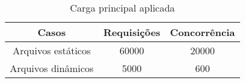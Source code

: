 \begin{table}[h!]
  \centering
  \begin{tabular}{|c|c|c|}
      \hline
    Casos & \textbf{Requisições} & \textbf{Concorrência}\\
      \hline\hline
    Arquivos estáticos & 60000 & 20000\\
      \hline
    Arquivos dinâmicos & 5000 & 600 \\
      \hline
  \end{tabular}
  \caption{Carga principal aplicada}
  \label{tab:loads}
\end{table}


